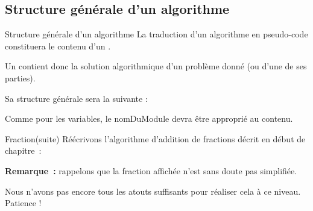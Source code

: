 \subsection{Structure générale d’un algorithme}
\begin{frame}{Structure générale d’un algorithme}
	La traduction d’un algorithme en pseudo-code constituera le contenu d’un
	. 
	
	\bigskip
	
	Un  contient donc la solution
	algorithmique d’un problème donné (ou d’une de ses parties). 
	
	\bigskip
	
	Sa structure générale sera la suivante :
	
	\bigskip
	
	
	\bigskip
	
	Comme pour les variables, le nomDuModule devra être approprié au contenu.
\end{frame}

\begin{frame}{Fraction(suite)}
	Réécrivons l’algorithme d’addition de fractions décrit
	en début de chapitre~:

	\bigskip
	
	
	\bigskip
	
	\textbf{Remarque~:}
	rappelons que la fraction affichée n'est sans doute pas simplifiée. 
	
	Nous n'avons pas encore tous les atouts suffisants pour réaliser 
	cela à ce niveau. Patience !
\end{frame}

